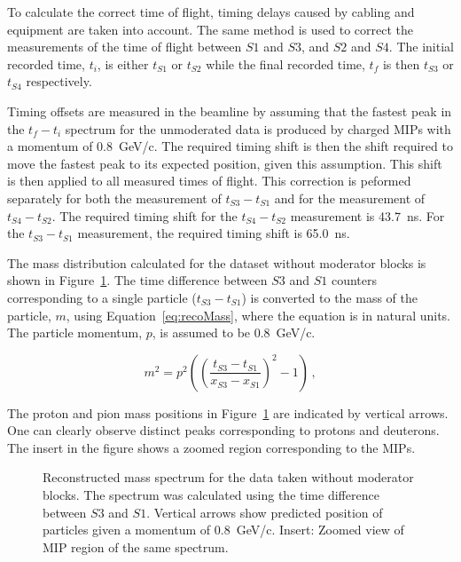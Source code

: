 To calculate the correct time of flight, timing delays caused by cabling and equipment are taken into account.
The same method is used to correct the measurements of the time of flight between $\mathit{S1}$ and $\mathit{S3}$, and $\mathit{S2}$ and $\mathit{S4}$.
The initial recorded time, $t_i$, is either $t_{\mathit{S1}}$ or $t_{\mathit{S2}}$ while the final recorded time, $t_f$ is then $t_{\mathit{S3}}$ or $t_{\mathit{S4}}$ respectively.

Timing offsets are measured in the beamline by assuming that the fastest peak in the $t_{f}-t_{i}$ spectrum for the unmoderated data is produced by charged MIPs with a momentum of 0.8~GeV/c.
The required timing shift is then the shift required to move the fastest peak to its expected position, given this assumption.
This shift is then applied to all measured times of flight.
This correction is peformed separately for both the measurement of $t_{\mathit{S3}}-t_{\mathit{S1}}$ and for the measurement of $t_{\mathit{S4}}-t_{\mathit{S2}}$.
The required timing shift for the $t_{\mathit{S4}}-t_{\mathit{S2}}$ measurement is 43.7~ns.
For the $t_{\mathit{S3}}-t_{\mathit{S1}}$ measurement, the required timing shift is 65.0~ns.

The mass distribution calculated for the dataset without moderator blocks is shown in Figure~\ref{fig:s3tof_mass}.
The time difference between $\mathit{S3}$ and $\mathit{S1}$ counters corresponding to a single particle ($t_{\mathit{S3}}-t_{\mathit{S1}}$) is converted to the mass of the particle, $m$, using Equation~\ref{eq:recoMass}, where the equation is in natural units.
The particle momentum, $p$, is assumed to be 0.8~GeV/c.

\begin{equation} 
  m^2 = p^2 \left( 
  \left(\frac{t_{\mathit{S3}}-t_{\mathit{S1}}}{x_{\mathit{S3}}-x_{\mathit{S1}}} \right)^2 - 1  \right) \,,
  \label{eq:recoMass}
\end{equation}

The proton and pion mass positions in Figure~\ref{fig:s3tof_mass} are indicated by vertical arrows.
One can clearly observe distinct peaks corresponding to protons and deuterons. 
The insert in the figure shows a zoomed region corresponding to the MIPs. 

\begin{figure}[ht]
  \begin{adjustbox}{max totalsize={\linewidth}, center}
    
  \end{adjustbox}
  \caption{Reconstructed mass spectrum for the data taken without moderator blocks. The spectrum was calculated using the time difference between $\mathit{S3}$ and $\mathit{S1}$. Vertical arrows show predicted position of particles given a momentum of 0.8~GeV/c. Insert: Zoomed view of MIP region of the same spectrum.}
  \label{fig:s3tof_mass}
\end{figure}

